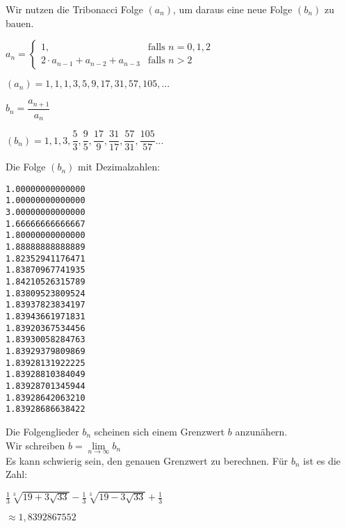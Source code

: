 \documentclass[11pt]{beamer}
\begin{document}
\begin{frame}[fragile]
Wir nutzen die Tribonacci Folge $(a_n)$, um daraus eine neue Folge $(b_n)$ zu bauen.  \pause

$a_n=\begin{cases}
 1,  & \text{falls } n=0,1,2 \\
 2 \cdot a_{n-1}+a_{n-2}+a_{n-3} & \text{falls } n > 2
\end{cases} $  \pause

$(a_n) = 1, 1,1,3,5,9,17,31,57,105,...$

$b_n = \dfrac{a_{n+1}}{a_n}$

$(b_n) = 1, 1,3,\dfrac{5}{3}, \dfrac{9}{5}, \dfrac{17}{9}, \dfrac{31}{17}, \dfrac{57}{31}, \dfrac{105}{57} ...$

Die Folge $(b_n)$ mit Dezimalzahlen:
\end{frame}

\begin{frame}[fragile]
\begin{minipage}[t]{4cm}
\begin{lstlisting} 
1.00000000000000
1.00000000000000
3.00000000000000
1.66666666666667
1.80000000000000
1.88888888888889
1.82352941176471
1.83870967741935
1.84210526315789
1.83809523809524
1.83937823834197
1.83943661971831
1.83920367534456
1.83930058284763
1.83929379809869
1.83928131922225
1.83928810384049
1.83928701345944
1.83928642063210
1.83928686638422
\end{lstlisting} 
\end{minipage} 
\begin{minipage}[t]{6cm}
\bigskip
Die Folgenglieder $b_n$ scheinen sich einem Grenzwert $b$ anzunähern.  \\

Wir schreiben $b = \lim \limits_{n \to \infty} b_n$ \\

Es kann schwierig sein, den genauen Grenzwert zu berechnen. Für $b_n$ ist es die Zahl: 
\bigskip

$\frac{1}{3}\sqrt[3]{19 + 3\sqrt{33}} - \frac{1}{3}\sqrt[3]{19 - 3\sqrt{33}} + \frac{1}{3}$ 
\bigskip

$\approx 1,8392867552$ 
\end{minipage} 
\end{frame}
\end{document}
